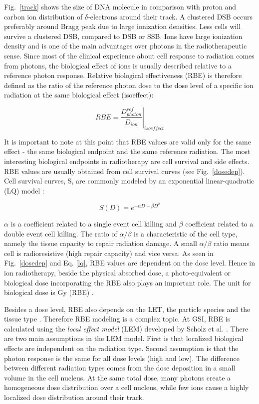 Fig.~\ref{track} shows the size of DNA molecule in comparison with proton and carbon ion distribution of $\delta$-electrons around their track. 
A clustered DSB occurs preferably around Bragg peak due to large ionization densities. Less cells will survive a clustered DSB, compared to DSB or SSB. Ions have large ionization density and is one of the main advantages over photons in the radiotherapeutic sense. Since most of the clinical experience about
cell response to radiation comes from photons, the biological effect of ions is usually described relative to a reference photon response. Relative biological effectiveness (RBE) is therefore defined as the ratio of the reference 
photon dose to the dose level of a specific ion radiation at the same biological effect (isoeffect):

\begin{equation}
 RBE = \left.\frac{D^{ref}_{photon}}{D_{ion}} \right|_{isoeffect}
\end{equation}

It is important to note at this point that RBE values are valid only for the same effect - the same biological endpoint and the same reference radiation. The most interesting biological endpoints in radiotherapy are cell survival and
side effects. RBE values are usually obtained from cell survival curves (see Fig.~\ref{dosedep}). Cell survival curves, S, are commonly modeled by an exponential linear-quadratic (LQ) model \cite{Fowler1989}:

\begin{equation}
 S(D) = e^{-\alpha D - \beta D^2}
 \label{lq}
\end{equation}

$\alpha$ is a coefficient related to a single event cell killing and $\beta$ coefficient related to a double event cell killing. The ratio of $\alpha / \beta$ is a characteristic of the cell type, namely the tissue 
capacity to repair radiation damage. A small $\alpha / \beta$ ratio means cell is radioresistive (high repair capacity) and vice versa.
As seen in Fig.~\ref{dosedep} and Eq. \ref{lq}, RBE values are dependent on the dose level. Hence in ion radiotherapy, beside the physical absorbed dose, a photo-equivalent or biological dose incorporating the RBE also plays an important role. 
The unit for biological dose is Gy (RBE) \cite{ICRU2007}. 

Besides a dose level, RBE also depends on the LET, the particle species and the tissue type \cite{Kraft2000}. Therefore RBE modeling is a complex topic.
At GSI, RBE is calculated using the \textit{local effect model} (LEM) developed by Scholz et al. \cite{Scholz1994}. There are two main assumptions in the LEM model. First is that localized biological 
effects are independent on the radiation type. Second assumption is that the photon response is the same for all dose levels (high and low).
The difference between different radiation types comes from the dose deposition in a small volume in the cell nucleus.
At the same total dose, many photons create a homogeneous dose distribution over a cell nucleus, while few ions cause a highly localized dose distribution around their track.

